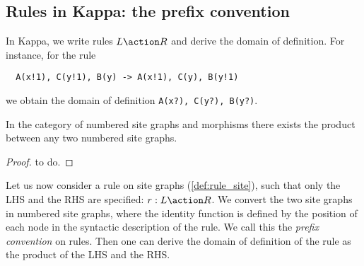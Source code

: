 \subsection{Rules in Kappa: the prefix convention}
\label{app:prefix_convention}

In Kappa, we write rules $L\action R$ and derive the domain of definition. For instance, for the rule
\begin{verbatim}
  A(x!1), C(y!1), B(y) -> A(x!1), C(y), B(y!1)
\end{verbatim}
we obtain the domain of definition \verb|A(x?), C(y?), B(y?)|.




\begin{lemma}
  In the category of numbered site graphs and morphisms there exists the product between any two numbered site graphs.
\end{lemma}
\begin{proof}
  to do.
\end{proof}

Let us now consider a rule on site graphs (\autoref{def:rule_site}), such that only the LHS and the RHS are specified: $r:L\action R$. We convert the two site graphs in numbered site graphs, where the identity function is defined by the position of each node in the syntactic description of the rule. We call this the \emph{prefix convention} on rules. Then one can derive the domain of definition of the rule as the product of the LHS and the RHS.

